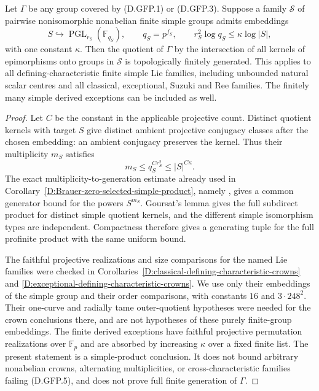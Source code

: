 \begin{corollary}
\label{D:global-unrestricted-projective-simple-products}
Let $\Gamma$ be any group covered by (D.GFP.1) or (D.GFP.3).
Suppose a family $\mathscr S$ of pairwise nonisomorphic nonabelian
finite simple groups admits embeddings
\[
 S\hookrightarrow\operatorname{PGL}_{r_S}(\mathbb F_{q_S}),
 \qquad q_S=p^{f_S},\qquad
 r_S^2\log q_S\leq\kappa\log|S|,                       \tag{D.GFP.5}
\]
with one constant $\kappa$. Then the quotient of $\Gamma$ by
the intersection of all kernels of epimorphisms onto groups in
$\mathscr S$ is topologically finitely generated.
This applies to all defining-characteristic finite simple Lie
families, including unbounded natural scalar centres and all
classical, exceptional, Suzuki and Ree families. The finitely
many simple derived exceptions can be included as well.
\end{corollary}

\begin{proof}
Let $C$ be the constant in the applicable projective count.
Distinct quotient kernels with target $S$ give distinct ambient
projective conjugacy classes after the chosen embedding: an
ambient conjugacy preserves the kernel. Thus their multiplicity
$m_S$ satisfies
\[
                         m_S\leq q_S^{Cr_S^2}
                                      \leq |S|^{C\kappa}.
                                                               \tag{D.GFP.6}
\]
The exact multiplicity-to-generation estimate already used in
Corollary~\ref{D:Brauer-zero-selected-simple-product}, namely
\citet[Proposition~2.6(ii), equations~(2.1)--(2.2), pp.~12--13]
{LucchiniMarionTracey2020D}, gives a common generator bound for
the powers $S^{m_S}$. Goursat's lemma gives the full subdirect
product for distinct simple quotient kernels, and the different
simple isomorphism types are independent. Compactness therefore
gives a generating tuple for the full profinite product with
the same uniform bound.

The faithful projective realizations and size comparisons for
the named Lie families were checked in
Corollaries~\ref{D:classical-defining-characteristic-crowns} and
\ref{D:exceptional-defining-characteristic-crowns}.
We use only their embeddings of the simple group and their
order comparisons, with constants $16$ and $3\cdot248^2$.
Their one-curve and radially tame outer-quotient hypotheses
were needed for the crown conclusions there, and are not
hypotheses of these purely finite-group embeddings.
The finite derived exceptions have faithful projective
permutation realizations over $\mathbb F_p$ and are absorbed
by increasing $\kappa$ over a fixed finite list.
The present statement is a simple-product conclusion.
It does not bound arbitrary nonabelian crowns, alternating
multiplicities, or cross-characteristic families failing
(D.GFP.5), and does not prove full finite generation of $\Gamma$.
\end{proof}

